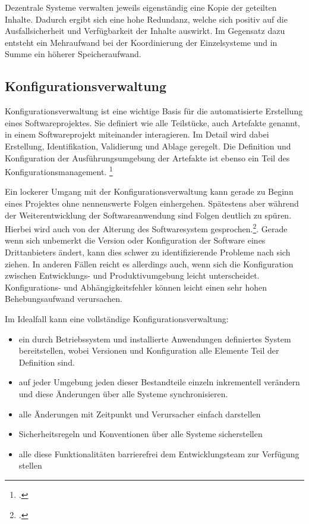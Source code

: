 Dezentrale Systeme verwalten jeweils eigenständig eine Kopie der geteilten Inhalte. Dadurch ergibt sich eine hohe 
Redundanz, welche sich positiv auf die Ausfallsicherheit und Verfügbarkeit der Inhalte auswirkt. Im Gegensatz dazu 
entsteht ein Mehraufwand bei der Koordinierung der Einzelsysteme und in Summe ein höherer Speicheraufwand.

\subsection{Konfigurationsverwaltung}
\label{subsec:konfigurationsverwaltung}

Konfigurationsverwaltung ist eine wichtige Basis für die automatisierte Erstellung eines Softwareprojektes. Sie definiert 
wie alle Teilstücke, auch Artefakte genannt, in einem Softwareprojekt miteinander interagieren. Im Detail wird dabei 
Erstellung, Identifikation, Validierung und Ablage geregelt. Die Definition und Konfiguration der Ausführungsumgebung der 
Artefakte ist ebenso ein Teil des Konfigurationsmanagement. \footcite[vgl.][]{humble2010}

Ein lockerer Umgang mit der Konfigurationsverwaltung kann gerade zu Beginn eines Projektes ohne nennenswerte Folgen 
einhergehen. Spätestens aber während der Weiterentwicklung der Softwareanwendung sind Folgen deutlich zu spüren. Hierbei 
wird auch von der Alterung des Softwaresystem gesprochen.\footcite[vgl.][]{software-quality2008}. Gerade wenn sich unbemerkt die 
Version oder Konfiguration der Software eines Drittanbieters ändert, kann dies schwer zu identifizierende Probleme nach 
sich ziehen. In anderen Fällen reicht es allerdings auch, wenn sich die Konfiguration zwischen Entwicklungs- und 
Produktivumgebung leicht unterscheidet. Konfigurations- und Abhängigkeitsfehler können leicht einen sehr hohen 
Behebungsaufwand verursachen.

Im Idealfall kann eine vollständige Konfigurationsverwaltung:
\begin{itemize}
\item ein durch Betriebssystem und installierte Anwendungen definiertes System bereitstellen, wobei Versionen und Konfiguration alle Elemente Teil der Definition sind.
\item auf jeder Umgebung jeden dieser Bestandteile einzeln inkrementell verändern und diese Änderungen über alle Systeme synchronisieren.
\item alle Änderungen mit Zeitpunkt und Verursacher einfach darstellen
\item Sicherheitsregeln und Konventionen über alle Systeme sicherstellen
\item alle diese Funktionalitäten barrierefrei dem Entwicklungsteam zur Verfügung stellen
\end{itemize}

